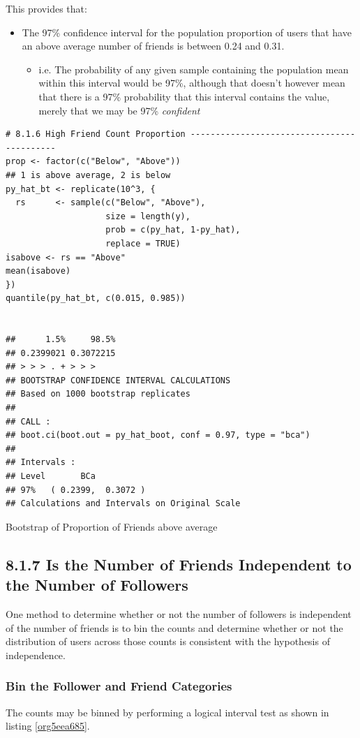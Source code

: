 \documentclass[11pt]{article}
\begin{document}
This provides that:
\begin{itemize}
\item The 97\% confidence interval for the population proportion of users that have an above average number of friends is between 0.24 and 0.31.
\begin{itemize}
\item i.e. The probability of any given sample containing the population mean within this interval would be 97\%, although  that doesn't however mean that there is a 97\% probability that this interval contains the value, merely that we may be 97\% \emph{confident}
\end{itemize}
\end{itemize}

\begin{listing}[htbp]
\begin{verbatim}
# 8.1.6 High Friend Count Proportion -------------------------------------------
prop <- factor(c("Below", "Above"))
## 1 is above average, 2 is below
py_hat_bt <- replicate(10^3, {
  rs      <- sample(c("Below", "Above"),
                    size = length(y),
                    prob = c(py_hat, 1-py_hat),
                    replace = TRUE)
isabove <- rs == "Above"
mean(isabove)
})
quantile(py_hat_bt, c(0.015, 0.985))


##      1.5%     98.5%
## 0.2399021 0.3072215
## > > > . + > > >
## BOOTSTRAP CONFIDENCE INTERVAL CALCULATIONS
## Based on 1000 bootstrap replicates
##
## CALL :
## boot.ci(boot.out = py_hat_boot, conf = 0.97, type = "bca")
##
## Intervals :
## Level       BCa
## 97%   ( 0.2399,  0.3072 )
## Calculations and Intervals on Original Scale
\end{verbatim}
\caption{\label{orgcc4ffd7}Bootstrap of Proportion of Friends above average}
\end{listing}
\subsection{8.1.7 Is the Number of Friends Independent to the Number of Followers}
\label{sec:org49d8ba9}
One method to determine whether or not the number of followers is independent of the number of friends is to bin the counts and determine whether or not the distribution of users across those counts is consistent with the hypothesis of independence.

\subsubsection{Bin the Follower and Friend Categories}
\label{sec:org7b8ea2a}
The counts may be binned by performing a logical interval test as shown in listing \ref{org5eea685}.
\end{document}
